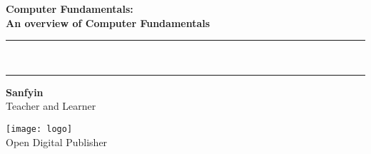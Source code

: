 
{}
{
\centering
\Huge\bfseries Computer Fundamentals:\\
 An overview of Computer Fundamentals\\[-4mm]
\color{red}  
 \rule{\linewidth}{1pt}\\[-6mm]
 \rule{\linewidth}{2pt}
}


\vskip3cm
{\noindent \LARGE \bfseries  Sanfyin}\\[5mm]

\noindent Teacher and Learner

\vfill 
\texttt{[image: logo]}\\[1mm]
Open Digital Publisher

\clearpage